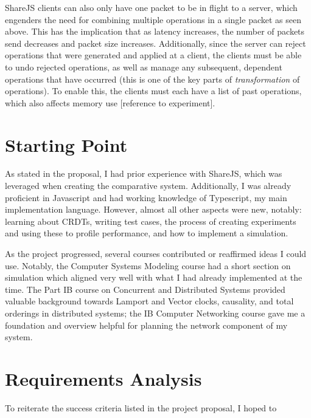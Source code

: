 \documentclass[12pt,a4paper,twoside,openright]{report}
\begin{document}
	ShareJS clients can also only have one packet to be in flight to a server, which engenders the need for combining multiple operations in a single packet as seen above. This has the implication that as latency increases, the number of packets send decreases and packet size increases. Additionally, since the server can reject operations that were generated and applied at a client, the clients must be able to undo rejected operations, as well as manage any subsequent, dependent operations that have occurred (this is one of the key parts of \textit{transformation} of operations). To enable this, the clients must each have a list of past operations, which also affects memory use [reference to experiment].

	
\section{Starting Point}

As stated in the proposal, I had prior experience with ShareJS, which was leveraged when creating the comparative system. Additionally, I was already proficient in Javascript and had working knowledge of Typescript, my main implementation language. However, almost all other aspects were new, notably: learning about CRDTs, writing test cases, the process of creating experiments and using these to profile performance, and how to implement a simulation.

As the project progressed, several courses contributed or reaffirmed ideas I could use. Notably, the Computer Systems Modeling \cite{compsysmodeling} course had a short section on simulation which aligned very well with what I had already implemented at the time. The Part IB course on Concurrent and Distributed Systems \cite{concdistsystems} provided valuable background towards Lamport and Vector clocks, causality, and total orderings in distributed systems; the IB Computer Networking course \cite{computernetworking} gave me a foundation and overview helpful for planning the network component of my system.



\section{Requirements Analysis}
To reiterate the success criteria listed in the project proposal, I hoped to
\end{document}
